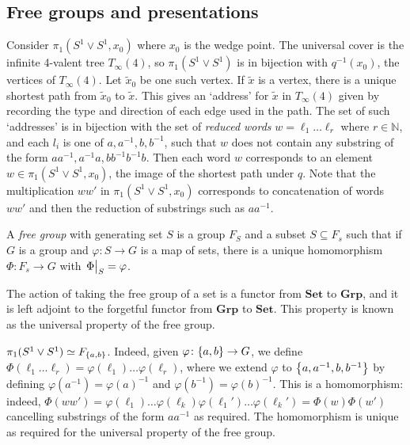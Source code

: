 \subsection{Free groups and presentations}
Consider \( \pi_1(S^1 \vee S^1, x_0) \) where \( x_0 \) is the wedge point.
The universal cover is the infinite 4-valent tree \( T_\infty(4) \), so \( \pi_1(S^1 \vee S^1) \) is in bijection with \( q^{-1}(x_0) \), the vertices of \( T_\infty(4) \).
Let \( \widetilde x_0 \) be one such vertex.
If \( \widetilde x \) is a vertex, there is a unique shortest path from \( \widetilde x_0 \) to \( \widetilde x \).
This gives an `address' for \( \widetilde x \) in \( T_\infty(4) \) given by recording the type and direction of each edge used in the path.
The set of such `addresses' is in bijection with the set of \emph{reduced words} \( w = \ell_1 \dots \ell_r \) where \( r \in \mathbb N \), and each \( l_i \) is one of \( a, a^{-1}, b, b^{-1} \), such that \( w \) does not contain any substring of the form \( aa^{-1}, a^{-1}a, bb^{-1} b^{-1}b \).
Then each word \( w \) corresponds to an element \( w \in \pi_1(S^1 \vee S^1, x_0) \), the image of the shortest path under \( q \).
Note that the multiplication \( ww' \) in \( \pi_1(S^1 \vee S^1, x_0) \) corresponds to concatenation of words \( ww' \) and then the reduction of substrings such as \( aa^{-1} \).
\begin{definition}
    A \emph{free group} with generating set \( S \) is a group \( F_S \) and a subset \( S \subseteq F_s \) such that if \( G \) is a group and \( \varphi \colon S \to G \) is a map of sets, there is a unique homomorphism \( \Phi \colon F_s \to G \) with \( \eval{\Phi}_S = \varphi \).
    \begin{center}
    \end{center}
\end{definition}
\begin{remark}
    The action of taking the free group of a set is a functor from \( \mathbf{Set} \) to \( \mathbf{Grp} \), and it is left adjoint to the forgetful functor from \( \mathbf{Grp} \) to \( \mathbf{Set} \).
    This property is known as the universal property of the free group.
\end{remark}
\begin{example}
    \( \pi_1(S^1 \vee S^1) \simeq F_{\qty{a,b}} \).
    Indeed, given \( \varphi \colon \qty{a,b} \to G \), we define \( \Phi(\ell_1 \dots \ell_r) = \varphi(\ell_1) \dots \varphi(\ell_r) \), where we extend \( \varphi \) to \( \qty{a, a^{-1}, b, b^{-1}} \) by defining \( \varphi(a^{-1}) = \varphi(a)^{-1} \) and \( \varphi(b^{-1}) = \varphi(b)^{-1} \).
    This is a homomorphism: indeed, \( \Phi(ww') = \varphi(\ell_1) \dots \varphi(\ell_k) \varphi(\ell_1') \dots \varphi(\ell_k') = \Phi(w)\Phi(w') \) cancelling substrings of the form \( aa^{-1} \) as required.
	The homomorphism is unique as required for the universal property of the free group.
\end{example}
